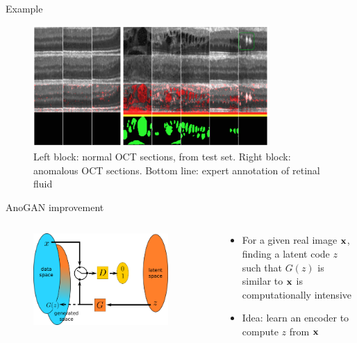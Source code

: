 \documentclass[xcolor=pdftex,dvipsnames,table,mathserif,aspectratio=169]{beamer}
\begin{document}
\begin{frame}{Example~\tiny{\cite{schlegl_unsupervised_2017}}}


  \begin{figure}[ht]
    \centering
    \includegraphics[width=0.8\textwidth]{res_oct}
    \caption*{Left block: normal OCT sections, from test set. Right block: anomalous OCT sections. Bottom line: expert annotation of retinal fluid}
  \end{figure}

\end{frame}


\begin{frame}{AnoGAN improvement}

  \begin{columns}
    \begin{column}{.5\textwidth}
  \begin{figure}[ht]
    \centering
    \includegraphics[width=0.9\textwidth]{gan2}
  \end{figure}

    \end{column}

    \begin{column}{.5\textwidth}
  \begin{itemize}
  \item For a given real image $\mathbf{x}$, finding a latent code $z$ such that $G(z)$ is similar to $\mathbf{x}$ is computationally intensive
  \item Idea: learn an encoder to compute $z$ from $\mathbf{x}$
  \end{itemize}

    \end{column}
  \end{columns}


\end{frame}
\end{document}

